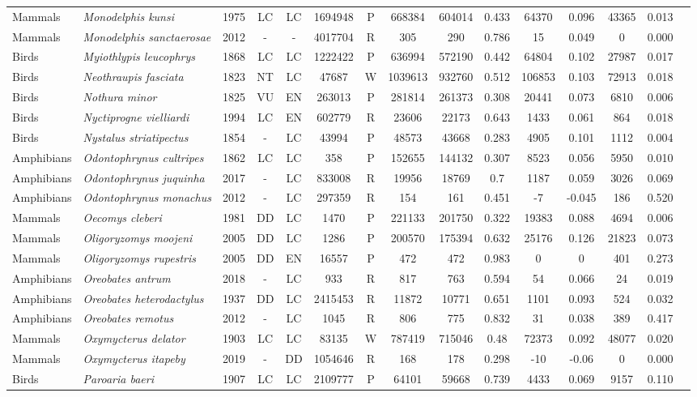 \documentclass[12pt,openright,oneside,a4paper,english]{abntex2}
\begin{document}
\begin{landscape}
\begin{longtable}{llccccccccccccc}
		Mammals&\textit{Monodelphis kunsi}&1975&LC&LC&1694948&P&668384&604014&0.433&64370&0.096&43365&0.013\\
		Mammals&\textit{Monodelphis sanctaerosae}&2012&-&-&4017704&R&305&290&0.786&15&0.049&0&0.000\\
		Birds&\textit{Myiothlypis leucophrys}&1868&LC&LC&1222422&P&636994&572190&0.442&64804&0.102&27987&0.017\\
		Birds&\textit{Neothraupis fasciata}&1823&NT&LC&47687&W&1039613&932760&0.512&106853&0.103&72913&0.018\\
		Birds&\textit{Nothura minor}&1825&VU&EN&263013&P&281814&261373&0.308&20441&0.073&6810&0.006\\
		Birds&\textit{Nyctiprogne vielliardi}&1994&LC&EN&602779&R&23606&22173&0.643&1433&0.061&864&0.018\\
		Birds&\textit{Nystalus striatipectus}&1854&-&LC&43994&P&48573&43668&0.283&4905&0.101&1112&0.004\\
		Amphibians&\textit{Odontophrynus cultripes}&1862&LC&LC&358&P&152655&144132&0.307&8523&0.056&5950&0.010\\
		Amphibians&\textit{Odontophrynus juquinha}&2017&-&LC&833008&R&19956&18769&0.7&1187&0.059&3026&0.069\\
		Amphibians&\textit{Odontophrynus monachus}&2012&-&LC&297359&R&154&161&0.451&-7&-0.045&186&0.520\\
		Mammals&\textit{Oecomys cleberi}&1981&DD&LC&1470&P&221133&201750&0.322&19383&0.088&4694&0.006\\
		Mammals&\textit{Oligoryzomys moojeni}&2005&DD&LC&1286&P&200570&175394&0.632&25176&0.126&21823&0.073\\
		Mammals&\textit{Oligoryzomys rupestris}&2005&DD&EN&16557&P&472&472&0.983&0&0&401&0.273\\
		Amphibians&\textit{Oreobates antrum}&2018&-&LC&933&R&817&763&0.594&54&0.066&24&0.019\\
		Amphibians&\textit{Oreobates heterodactylus}&1937&DD&LC&2415453&R&11872&10771&0.651&1101&0.093&524&0.032\\
		Amphibians&\textit{Oreobates remotus}&2012&-&LC&1045&R&806&775&0.832&31&0.038&389&0.417\\
		Mammals&\textit{Oxymycterus delator}&1903&LC&LC&83135&W&787419&715046&0.48&72373&0.092&48077&0.020\\
		Mammals&\textit{Oxymycterus itapeby}&2019&-&DD&1054646&R&168&178&0.298&-10&-0.06&0&0.000\\
		Birds&\textit{Paroaria baeri}&1907&LC&LC&2109777&P&64101&59668&0.739&4433&0.069&9157&0.110\\

\end{longtable}
\end{landscape}
\end{document}
